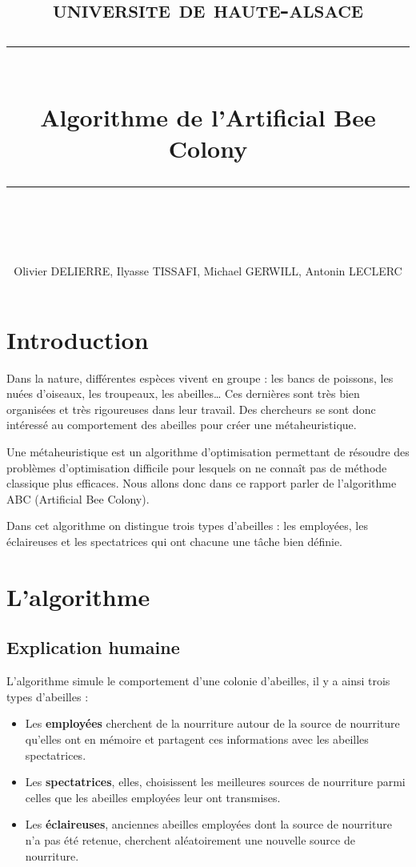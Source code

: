 \documentclass[a4paper, fontsize=11pt]{article}
\begin{document}
\newcommand{\horrule}[1]{\rule{\linewidth}{#1}} 

\title{
\normalfont \normalsize
\textsc{universite de haute-alsace} \\ [25pt]
\horrule{0.5pt} \\ [0.4cm]
\huge Algorithme de l'Artificial Bee Colony
\horrule{2pt} \\ [0.5cm]
}

\author{Olivier DELIERRE, Ilyasse TISSAFI, Michael GERWILL, Antonin LECLERC}

\maketitle

\normalfont

\section{Introduction}
Dans la nature, différentes espèces vivent en groupe : les bancs de poissons, les nuées d’oiseaux, les troupeaux, les abeilles… Ces dernières sont très bien organisées et très rigoureuses dans leur travail. Des chercheurs se sont donc intéressé au comportement des abeilles pour créer une métaheuristique.

Une métaheuristique est un algorithme d’optimisation permettant de résoudre des problèmes d’optimisation difficile pour lesquels on ne connaît pas de méthode classique plus efficaces. Nous allons donc dans ce rapport parler de l’algorithme ABC (Artificial Bee Colony)\cite{official}.


Dans cet algorithme on distingue trois types d’abeilles : les employées, les éclaireuses et les spectatrices qui ont chacune une tâche bien définie.

\newpage

\tableofcontents

\newpage

\section{L'algorithme}
\subsection{Explication humaine}
L’algorithme simule le comportement d’une colonie d’abeilles, il y a ainsi trois types d’abeilles :
\begin{itemize}
\item Les \textbf{employées} cherchent de la nourriture autour de la source de nourriture qu’elles ont en mémoire et partagent ces informations avec les abeilles spectatrices.
\item Les \textbf{spectatrices}, elles, choisissent les meilleures sources de nourriture parmi celles que les abeilles employées leur ont transmises. 
\item Les \textbf{éclaireuses}, anciennes abeilles employées dont la source de nourriture n’a pas été retenue, cherchent aléatoirement une nouvelle source de nourriture.
\end{itemize}
\end{document}
